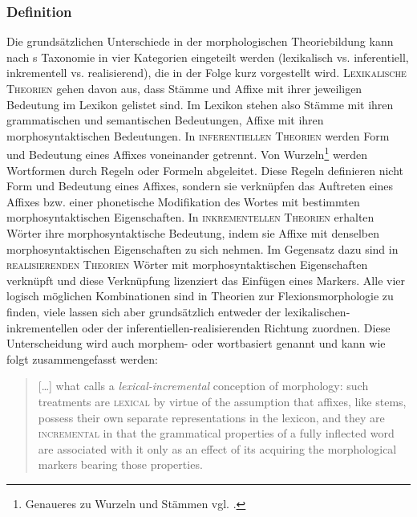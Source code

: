 \subsubsection{Definition} Die grundsätzlichen Unterschiede in der morphologischen Theoriebildung kann nach \citeauthor{Stump2001}s \citeyearpar[1-2]{Stump2001} Taxonomie in vier Kategorien eingeteilt werden (lexikalisch vs. inferentiell, inkrementell vs. realisierend), die in der Folge kurz vorgestellt wird. \textsc{Lexikalische Theorien} gehen davon aus, dass Stämme und Affixe mit ihrer jeweiligen Bedeutung im Lexikon gelistet sind. Im Lexikon stehen also Stämme mit ihren grammatischen und semantischen Bedeutungen, Affixe mit ihren morphosyntaktischen Bedeutungen. In \textsc{inferentiellen Theorien} werden Form und Bedeutung eines Affixes voneinander getrennt. Von Wurzeln\footnote{Genaueres zu Wurzeln und Stämmen vgl. .} werden Wortformen durch Regeln oder Formeln abgeleitet. Diese Regeln definieren nicht Form und Bedeutung eines Affixes, sondern sie verknüpfen das Auftreten eines Affixes bzw. einer phonetische Modifikation des Wortes mit bestimmten morphosyntaktischen Eigenschaften. In \textsc{inkrementellen Theorien} erhalten Wörter ihre morphosyntaktische Bedeutung, indem sie Affixe mit denselben morphosyntaktischen Eigenschaften zu sich nehmen. Im Gegensatz dazu sind in \textsc{realisierenden Theorien} Wörter mit morphosyntaktischen Eigenschaften verknüpft und diese Verknüpfung lizenziert das Einfügen eines Markers. Alle vier logisch möglichen Kombinationen sind in Theorien zur Flexionsmorphologie zu finden, viele lassen sich aber grundsätzlich entweder der le\-xi\-ka\-li\-schen-in\-kre\-men\-tel\-len oder der in\-fe\-ren\-tiel\-len-re\-a\-li\-sie\-ren\-den Richtung zuordnen. Diese Unterscheidung wird auch morphem- oder wortbasiert genannt und kann wie folgt zusammengefasst werden:

\begin{quote}
[…] what \citet{Stump2001} calls a \textit{lexical-incremental} conception of morphology: such treatments are \textsc{lexical} by virtue of the assumption that affixes, like stems, possess their own separate representations in the lexicon, and they are \textsc{incremental} in that the grammatical properties of a fully inflected word are associated with it only as an effect of its acquiring the morphological markers bearing those properties. \citep[112]{AckermanStump2004}
\end{quote}


